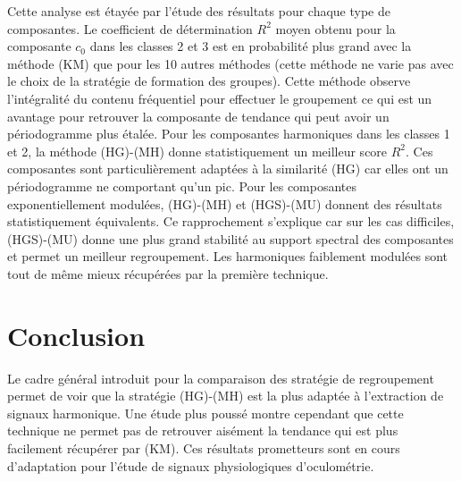 \documentclass{gretsi}
\begin{document}
Cette analyse est étayée par l'étude des résultats pour chaque type de composantes.
Le coefficient de détermination $R^2$ moyen obtenu pour la composante $c_0$ dans les classes 2 et 3 est en probabilité plus grand avec la méthode (KM) que pour les 10 autres méthodes (cette méthode ne varie pas avec le choix de la stratégie de formation des groupes). 
Cette méthode observe l'intégralité du contenu fréquentiel pour effectuer le groupement ce qui est un avantage pour retrouver la composante de tendance qui peut avoir un périodogramme plus étalée. 
Pour les composantes harmoniques dans les classes 1 et 2, la méthode (HG)-(MH) donne statistiquement un meilleur score $R^2$. 
Ces composantes sont particulièrement adaptées à la similarité (HG) car elles ont un périodogramme ne comportant qu'un pic.
Pour les composantes exponentiellement modulées, (HG)-(MH) et (HGS)-(MU) donnent des résultats statistiquement équivalents. Ce rapprochement s'explique car sur les cas difficiles, (HGS)-(MU) donne une plus grand stabilité au support spectral des composantes et permet un meilleur regroupement. Les harmoniques faiblement modulées sont tout de même mieux récupérées par la première technique.



\section{Conclusion}
\label{sec:ccl}

Le cadre général introduit pour la comparaison des stratégie de regroupement permet de voir que la stratégie (HG)-(MH) est la plus adaptée à l'extraction de signaux harmonique. Une étude plus poussé montre cependant que cette technique ne permet pas de retrouver aisément la tendance qui est plus facilement récupérer par (KM). Ces résultats prometteurs sont en cours d'adaptation pour l'étude de signaux physiologiques d'oculométrie.


 
\scriptsize
{}
\end{document}

